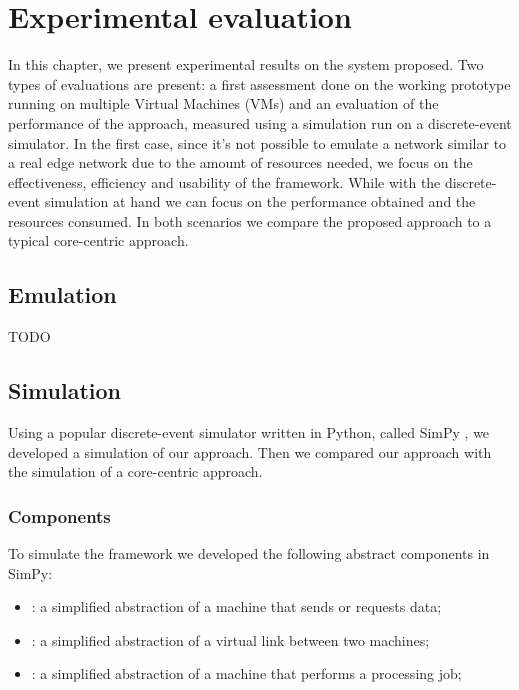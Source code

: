 \chapter{Experimental evaluation}
\label{ch:experiments}

In this chapter, we present experimental results on the system proposed. Two types of evaluations are present: a first assessment done on the working prototype running on multiple Virtual Machines (VMs) and an evaluation of the performance of the approach, measured using a simulation run on a discrete-event simulator.
In the first case, since it's not possible to emulate a network similar to a real edge network due to the amount of resources needed, we focus on the effectiveness, efficiency and usability of the framework.
While with the discrete-event simulation at hand we can focus on the performance obtained and the resources consumed.
In both scenarios we compare the proposed approach to a typical core-centric approach.



\section{Emulation}
TODO



\section{Simulation}
Using a popular discrete-event simulator written in Python, called SimPy \cite{simpy}, we developed a simulation of our approach. Then we compared our approach with the simulation of a core-centric approach.


\subsection{Components}
To simulate the framework we developed the following abstract components in SimPy:
\begin{itemize}
    \item {}: a simplified abstraction of a machine that sends or requests data;
    \item {}: a simplified abstraction of a virtual link between two machines;
    \item {}: a simplified abstraction of a machine that performs a processing job;
\end{itemize}

